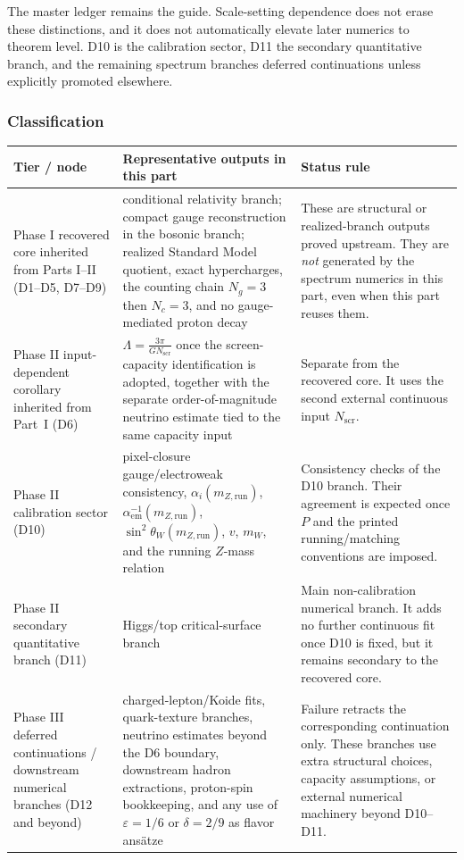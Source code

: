 The master ledger remains the guide. Scale-setting dependence does not erase these distinctions, and it does not automatically elevate later numerics to theorem level. D10 is the calibration sector, D11 the secondary quantitative branch, and the remaining spectrum branches deferred continuations unless explicitly promoted elsewhere.

\subsubsection{Classification}\label{1b3-classification}

{\footnotesize
\def\LTcaptype{none}
\begin{longtable}[]{@{}>{\RaggedRight\arraybackslash}p{}>{\RaggedRight\arraybackslash}p{}>{\RaggedRight\arraybackslash}p{}@{}}
\toprule
Tier / node & Representative outputs in this part & Status rule \\
\midrule
\endhead
\bottomrule
\endfoot
Phase I recovered core inherited from Parts I--II (D1--D5, D7--D9) & conditional relativity branch; compact gauge reconstruction in the bosonic branch; realized Standard Model quotient, exact hypercharges, the counting chain \(N_g=3\) then \(N_c=3\), and no gauge-mediated proton decay & These are structural or realized-branch outputs proved upstream. They are \emph{not} generated by the spectrum numerics in this part, even when this part reuses them. \\
Phase II input-dependent corollary inherited from Part~I (D6) & \(\Lambda=\frac{3\pi}{G N_{\mathrm{scr}}}\) once the screen-capacity identification is adopted, together with the separate order-of-magnitude neutrino estimate tied to the same capacity input & Separate from the recovered core. It uses the second external continuous input \(N_{\mathrm{scr}}\). \\
Phase II calibration sector (D10) & pixel-closure gauge/electroweak consistency, \(\alpha_i(m_{Z,\text{run}})\), \(\alpha_{\mathrm{em}}^{-1}(m_{Z,\text{run}})\), \(\sin^2\theta_W(m_{Z,\text{run}})\), \(v\), \(m_W\), and the running \(Z\)-mass relation & Consistency checks of the D10 branch. Their agreement is expected once \(P\) and the printed running/matching conventions are imposed. \\
Phase II secondary quantitative branch (D11) & Higgs/top critical-surface branch & Main non-calibration numerical branch. It adds no further continuous fit once D10 is fixed, but it remains secondary to the recovered core. \\
Phase III deferred continuations / downstream numerical branches (D12 and beyond) & charged-lepton/Koide fits, quark-texture branches, neutrino estimates beyond the D6 boundary, downstream hadron extractions, proton-spin bookkeeping, and any use of \(\varepsilon=1/6\) or \(\delta=2/9\) as flavor ans\"atze & Failure retracts the corresponding continuation only. These branches use extra structural choices, capacity assumptions, or external numerical machinery beyond D10--D11. \\
\end{longtable}
}

